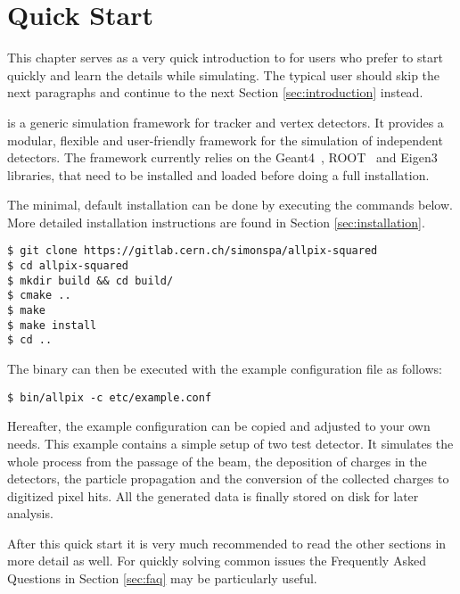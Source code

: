 \section{Quick Start}
This chapter serves as a very quick introduction to \apsq for users who prefer to start quickly and learn the details while simulating. The typical user should skip the next paragraphs and continue to the next Section \ref{sec:introduction} instead. 

\apsq is a generic simulation framework for tracker and vertex detectors. It provides a modular, flexible and user-friendly framework for the simulation of independent detectors. The framework currently relies on the Geant4~\cite{geant4}, ROOT~\cite{root} and Eigen3~\cite{eigen3} libraries, that need to be installed and loaded before doing a full installation.

The minimal, default installation can be done by executing the commands below. More detailed installation instructions are found in Section \ref{sec:installation}.
\begin{verbatim}
$ git clone https://gitlab.cern.ch/simonspa/allpix-squared
$ cd allpix-squared
$ mkdir build && cd build/
$ cmake ..
$ make
$ make install
$ cd ..
\end{verbatim}
The binary can then be executed with the example configuration file as follows:
\begin{verbatim}
$ bin/allpix -c etc/example.conf
\end{verbatim}

Hereafter, the example configuration can be copied and adjusted to your own needs. This example contains a simple setup of two test detector. It simulates the whole process from the passage of the beam, the deposition of charges in the detectors, the particle propagation and the conversion of the collected charges to digitized pixel hits. All the generated data is finally stored on disk for later analysis.

After this quick start it is very much recommended to read the other sections in more detail as well. For quickly solving common issues the Frequently Asked Questions in Section \ref{sec:faq} may be particularly useful.
